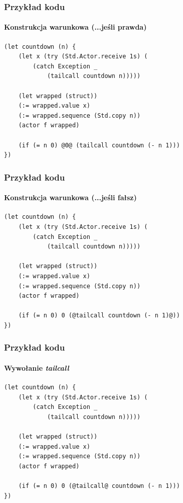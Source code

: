 \documentclass{beamer}
\begin{document}
\begin{frame}[fragile]
    \frametitle{Przykład kodu}
    \framesubtitle{Konstrukcja warunkowa (...jeśli prawda)}

    \begin{small}
    \begin{lstlisting}
(let countdown (n) {
    (let x (try (Std.Actor.receive 1s) (
        (catch Exception _
            (tailcall countdown n)))))

    (let wrapped (struct))
    (:= wrapped.value x)
    (:= wrapped.sequence (Std.copy n))
    (actor f wrapped)

    (if (= n 0) @0@ (tailcall countdown (- n 1)))
})
    \end{lstlisting}
    \end{small}
\end{frame}

\begin{frame}[fragile]
    \frametitle{Przykład kodu}
    \framesubtitle{Konstrukcja warunkowa (...jeśli fałsz)}

    \begin{small}
    \begin{lstlisting}
(let countdown (n) {
    (let x (try (Std.Actor.receive 1s) (
        (catch Exception _
            (tailcall countdown n)))))

    (let wrapped (struct))
    (:= wrapped.value x)
    (:= wrapped.sequence (Std.copy n))
    (actor f wrapped)

    (if (= n 0) 0 (@tailcall countdown (- n 1)@))
})
    \end{lstlisting}
    \end{small}
\end{frame}

\begin{frame}[fragile]
    \frametitle{Przykład kodu}
    \framesubtitle{Wywołanie \emph{tailcall}}

    \begin{small}
    \begin{lstlisting}
(let countdown (n) {
    (let x (try (Std.Actor.receive 1s) (
        (catch Exception _
            (tailcall countdown n)))))

    (let wrapped (struct))
    (:= wrapped.value x)
    (:= wrapped.sequence (Std.copy n))
    (actor f wrapped)

    (if (= n 0) 0 (@tailcall@ countdown (- n 1)))
})
    \end{lstlisting}
    \end{small}
\end{frame}
\end{document}
